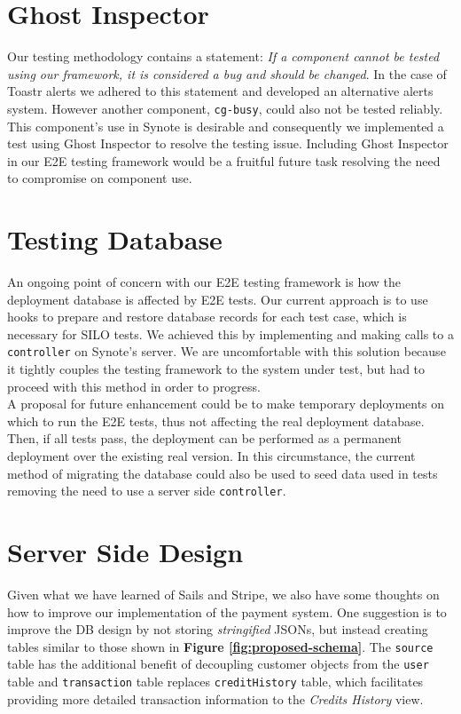 \section{Ghost Inspector}
\label{subsec:ghost-inspector}

Our testing methodology contains a statement: \textit{If a component cannot be tested using our framework, it is considered a bug and should be changed}. In the case of Toastr alerts we adhered to this statement and developed an alternative alerts system. However another component, \texttt{cg-busy}, could also not be tested reliably. This component's use in Synote is desirable and consequently we implemented a test using Ghost Inspector to resolve the testing issue. Including Ghost Inspector in our E2E testing framework would be a fruitful future task resolving the need to compromise on component use.

\section{Testing Database}
\label{subsec:testing-database}

An ongoing point of concern with our E2E testing framework is how the deployment database is affected by E2E tests. Our current approach is to use hooks to prepare and restore database records for each test case, which is necessary for SILO tests. We achieved this by implementing and making calls to a \texttt{controller} on Synote's server. We are uncomfortable with this solution because it tightly couples the testing framework to the system under test, but had to proceed with this method in order to progress.\\

A proposal for future enhancement could be to make temporary deployments on which to run the E2E tests, thus not affecting the real deployment database. Then, if all tests pass, the deployment can be performed as a permanent deployment over the existing real version. In this circumstance, the current method of migrating the database could also be used to seed data used in tests removing the need to use a server side \texttt{controller}.

\section{Server Side Design}
\label{subsec:server-side-design}

Given what we have learned of Sails and Stripe, we also have some thoughts on how to improve our implementation of the payment system. One suggestion is to improve the DB design by not storing \textit{stringified} JSONs, but instead creating tables similar to those shown in \textbf{Figure \ref{fig:proposed-schema}}. The \texttt{source} table has the additional benefit of decoupling customer objects from the \texttt{user} table and \texttt{transaction} table replaces \texttt{creditHistory} table, which facilitates providing more detailed transaction information to the \textit{Credits History} view.\\

